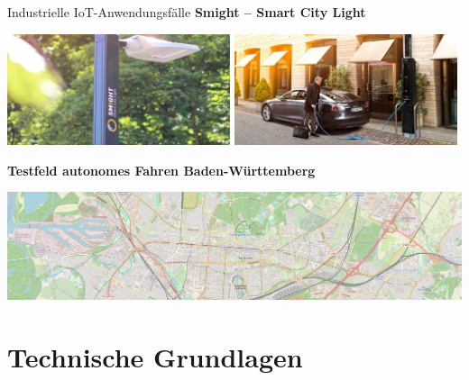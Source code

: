 \begin{frame}[allowframebreaks]{Industrielle IoT-Anwendungsfälle}
    \textbf{Smight -- Smart City Light}
    \hfill

    \includegraphics[width=0.49\textwidth]{img/smight1}
    \hfill
    \includegraphics[width=0.49\textwidth]{img/smight2}

    \bigskip

    \textbf{Testfeld autonomes Fahren Baden-Württemberg}
    \hfill

    \includegraphics[width=\textwidth]{img/karlsruhe}
\end{frame}

\section{Technische Grundlagen}

